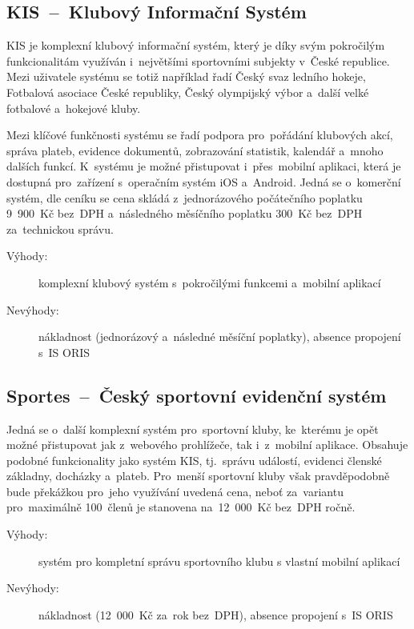 \subsection{KIS~–~Klubový Informační Systém}
KIS je komplexní klubový informační systém, který je díky svým pokročilým funkcionalitám využíván i~největšími sportovními subjekty v~České republice. Mezi uživatele systému se totiž například řadí Český svaz ledního hokeje, Fotbalová asociace České republiky, Český olympijský výbor a~další velké fotbalové a~hokejové kluby. \cite{esports, ceskyhokej}

Mezi klíčové funkčnosti systému se řadí podpora pro~pořádání klubových akcí, správa plateb, evidence dokumentů, zobrazování statistik, kalendář a~mnoho dalších funkcí. K~systému je možné přistupovat i~přes~mobilní aplikaci, která je dostupná pro~zařízení s~operačním systém iOS a~Android. Jedná se o~komerční systém, dle ceníku se cena skládá z~jednorázového počátečního poplatku 9~900~Kč bez~DPH a~následného měsíčního poplatku 300~Kč bez~DPH za~technickou správu. \cite{esports}

\begin{description}
	\item[Výhody:] komplexní klubový systém s~pokročilými funkcemi a~mobilní aplikací
	\item[Nevýhody:] nákladnost (jednorázový a~následné měsíční poplatky), absence propojení s~IS ORIS
\end{description}

\subsection{Sportes~–~Český sportovní evidenční systém}
Jedná se o~další komplexní systém pro~sportovní kluby, ke~kterému je opět možné přistupovat jak z~webového prohlížeče, tak i~z~mobilní aplikace. Obsahuje podobné funkcionality jako systém KIS, tj.~správu událostí, evidenci členské základny, docházky a~plateb. Pro~menší sportovní kluby však pravděpodobně bude překážkou pro~jeho využívání uvedená cena, neboť za~variantu pro~maximálně 100~členů je stanovena na~12~000~Kč bez~DPH ročně. \cite{sportes}

\begin{description}
	\item[Výhody:] systém pro kompletní správu sportovního klubu s vlastní mobilní aplikací
	\item[Nevýhody:] nákladnost (12~000~Kč za~rok bez~DPH), absence propojení s~IS ORIS
\end{description}

